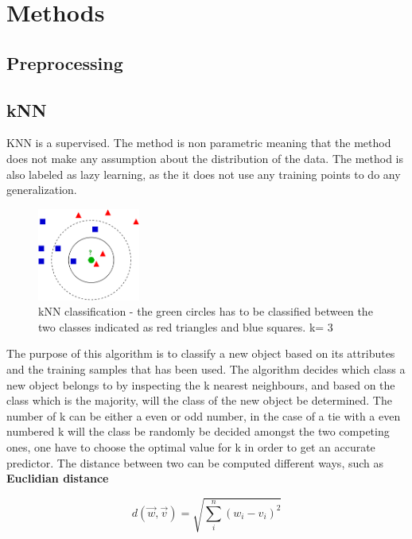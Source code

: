\section{Methods}
\subsection{Preprocessing}
\subsection{kNN}
KNN is a supervised. The method is non parametric meaning that the method does not make any assumption about the distribution of the data. The method is also labeled as lazy learning, as the it does not use any training points to do any generalization.\\

\begin{figure}[H]
\centering
\includegraphics[width = 0.3\textwidth]{img/kNN-classification.png}
\caption{kNN classification  - the green circles has to be classified between the two classes indicated as red triangles and blue squares. k= 3}
\end{figure}

The purpose of this algorithm is to classify a new object based on its attributes and the training samples that has been used. The algorithm decides which class a new object belongs to by inspecting the k nearest neighbours, and based on the class which is the majority, will the class of the new object be determined. The number of k can be either a even or odd number, in the case of a tie with a even numbered k will the class be randomly be decided amongst the two competing ones, one have to choose the optimal value for k  in order to get an accurate predictor. The distance between two can be computed different ways, such as \\

\textbf{Euclidian distance}

\begin{equation}
d(\overrightarrow{w},\overrightarrow{v}) = \sqrt{\sum_{i}^n (w_i - v_i)^2}
\end{equation}

